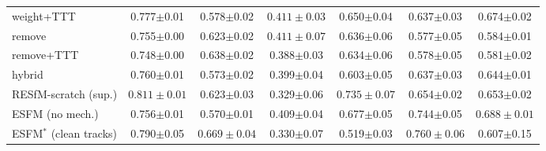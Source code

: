 \documentclass{article}
\begin{document}
\begin{table}[h]
\begin{tabular}{@{}lcccccc@{}}
weight+TTT   & 0.777$\pm$0.01 & 0.578$\pm$0.02 & $\mathbf{0.411\pm0.03}$ & 0.650$\pm$0.04 & 0.637$\pm$0.03 & 0.674$\pm$0.02\\
remove       & 0.755$\pm$0.00 & 0.623$\pm$0.02 & $\mathbf{0.411\pm0.07}$ & 0.636$\pm$0.06 & 0.577$\pm$0.05 & 0.584$\pm$0.01\\
remove+TTT   & 0.748$\pm$0.00 & 0.638$\pm$0.02 & 0.388$\pm$0.03 & 0.634$\pm$0.06 & 0.578$\pm$0.05 & 0.581$\pm$0.02\\
hybrid       & 0.760$\pm$0.01 & 0.573$\pm$0.02 & 0.399$\pm$0.04 & 0.603$\pm$0.05 & 0.637$\pm$0.03 & 0.644$\pm$0.01\\
RESfM-scratch (sup.) & $\mathbf{0.811\pm0.01}$ & 0.623$\pm$0.03 & 0.329$\pm$0.06 & $\mathbf{0.735\pm0.07}$ & 0.654$\pm$0.02 & 0.653$\pm$0.02\\
ESFM (no mech.) & 0.756$\pm$0.01 & 0.570$\pm$0.01 & 0.409$\pm$0.04 & 0.677$\pm$0.05 & 0.744$\pm$0.05 & $\mathbf{0.688\pm0.01}$\\
ESFM$^{\ast}$ (clean tracks) & 0.790$\pm$0.05 & $\mathbf{0.669\pm0.04}$ & 0.330$\pm$0.07 & 0.519$\pm$0.03 & $\mathbf{0.760\pm0.06}$ & 0.607$\pm$0.15\\
\bottomrule
\end{tabular}
\end{table}
\end{document}
